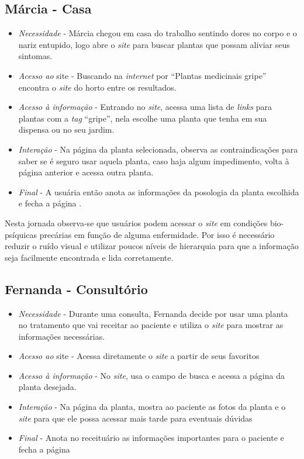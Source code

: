 \subsection{Márcia - Casa}\label{marcia---casa}

\begin{itemize}
\item
  \emph{Necessidade} - Márcia chegou em casa do trabalho sentindo dores no corpo e o nariz entupido, logo abre o \emph{site} para buscar plantas que possam aliviar seus sintomas.
\item
  \emph{Acesso ao} site - Buscando na \emph{internet} por ``Plantas medicinais gripe'' encontra o \emph{site} do horto entre os resultados.
\item
  \emph{Acesso à informação} - Entrando no \emph{site}, acessa uma lista de \emph{links} para plantas com a \emph{tag} ``gripe'', nela escolhe uma planta que tenha em sua dispensa ou no seu jardim.
\item
  \emph{Interação} - Na página da planta selecionada, observa as contraindicações para saber se é seguro usar aquela planta, caso haja algum impedimento, volta à página anterior e acessa outra planta.
\item
  \emph{Final} - A usuária então anota as informações da posologia da planta escolhida e fecha a página .
\end{itemize}

Nesta jornada observa-se que usuários podem acessar o \emph{site} em condições bio-psíquicas precárias em função de alguma enfermidade. Por isso é necessário reduzir o ruído visual e utilizar poucos níveis de hierarquia para que a informação seja facilmente encontrada e lida corretamente.

\subsection{Fernanda - Consultório}\label{fernanda---consultorio}

\begin{itemize}
\item
  \emph{Necessidade} - Durante uma consulta, Fernanda decide por usar uma planta no tratamento que vai receitar ao paciente e utiliza o \emph{site} para mostrar as informações necessárias.
\item
  \emph{Acesso ao} site - Acessa diretamente o \emph{site} a partir de seus favoritos
\item
  \emph{Acesso à informação} - No \emph{site}, usa o campo de busca e acessa a página da planta desejada.
\item
  \emph{Interação} - Na página da planta, mostra ao paciente as fotos da planta e o \emph{site} para que ele possa acessar mais tarde para eventuais dúvidas
\item
  \emph{Final} - Anota no receituário as informações importantes para o paciente e fecha a página
\end{itemize}

